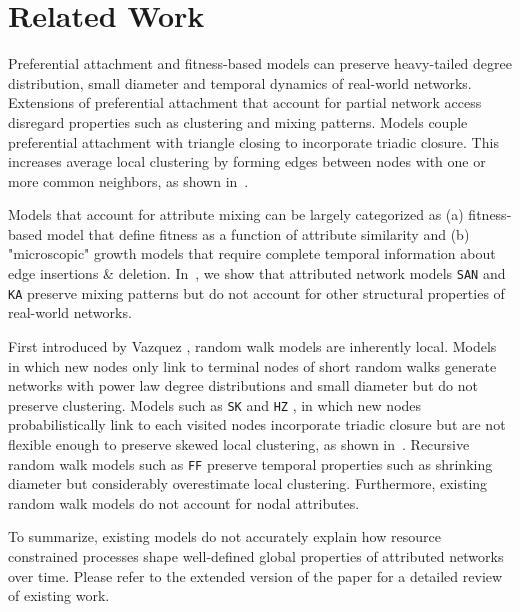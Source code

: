 
\section{Related Work}
\label{sec:Related Work}

Preferential attachment and fitness-based models \cite{bell2017network,medo2011temporal,bianconi2001bose,caldarelli2002scale}
can preserve heavy-tailed degree distribution, small diameter \cite{bollobas2004diameter} and temporal dynamics \cite{wang2013quantifying}
of real-world networks. Extensions of preferential attachment \cite{mossa2002truncation,zeng2005construction,wang2009local} that account for
partial network access disregard properties such as clustering and mixing patterns.
Models
\cite{holme2002growing,klemm2002highly,leskovec2008microscopic}
couple preferential attachment with triangle closing to incorporate triadic closure.
This increases {average} local clustering by forming edges between nodes
with one or more common neighbors, as shown in~.


Models \cite{de2013scale,karimi2017visibility,gong2012evolution,zheleva2009co}
that account for attribute mixing can be largely categorized as (a) fitness-based model that define fitness as a function of
attribute similarity and (b) "microscopic" growth models  that require
complete temporal information about edge insertions \& deletion.
In~, we show that attributed network models
\texttt{SAN} and \texttt{KA} preserve mixing patterns but do not account for other
structural properties of real-world networks.

First introduced by Vazquez \cite{vazquez2000knowing}, random walk models are inherently local.
Models \cite{blum2006random} in which
new nodes only link to terminal nodes of short random walks generate
networks with power law degree distributions \cite{chebolu2008pagerank} and
small diameter \cite{mehrabian2016sa} but do not preserve clustering. Models
such as \texttt{SK} \cite{saramaki2004scale}
and \texttt{HZ} \cite{herrera2011generating}, in which new nodes probabilistically link to
each visited nodes incorporate triadic closure but are not flexible enough to preserve
{skewed} local clustering, as shown in~.
Recursive random walk models such as \texttt{FF} \cite{leskovec2005graphs}
preserve temporal properties such as shrinking diameter but considerably overestimate local clustering.
Furthermore, existing random walk models do not account for nodal attributes.

To summarize, existing models do not accurately explain how resource constrained processes
shape well-defined global properties of attributed networks over time.
Please refer to the
extended version of the paper \cite{shah2017growing} for a detailed review of existing work.
